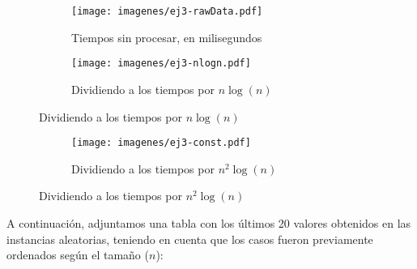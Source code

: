\begin{figure}[H]
        \centering
\begin{subfigure}[b]{0.5\textwidth}
                \texttt{[image: imagenes/ej3-rawData.pdf]}
                \caption*{Tiempos sin procesar, en milisegundos}
        \end{subfigure}%

        \begin{subfigure}[b]{0.5\textwidth}
                \texttt{[image: imagenes/ej3-nlogn.pdf]}
                \caption*{Dividiendo a los tiempos por $n \log(n)$}
        \end{subfigure}

\end{figure}

\begin{figure}[H]
        \centering

        \begin{subfigure}[b]{0.5\textwidth}
                \texttt{[image: imagenes/ej3-const.pdf]}
                \caption*{Dividiendo a los tiempos por $n^2 \log(n)$}
        \end{subfigure}

\end{figure}


A continuación, adjuntamos una tabla con los últimos 20 valores obtenidos en las instancias aleatorias, teniendo en cuenta que los casos fueron previamente ordenados según el tamaño ($n$):

